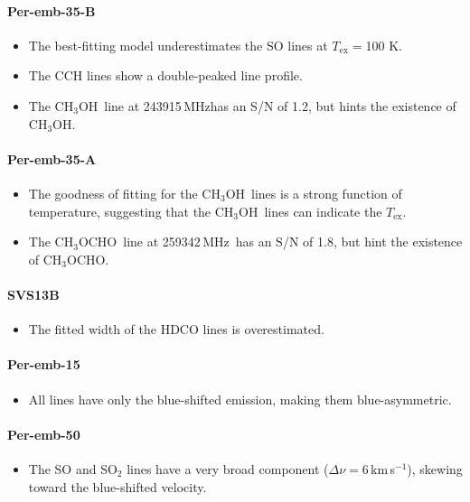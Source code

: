 \documentclass[twocolumn]{aastex62}
\newcommand{\kms}{\mbox{\,km\,s$^{-1}$}}
\newcommand{\mhz}{\mbox{\,MHz}}
\newcommand{\methylformate}{\mbox{CH$_{3}$OCHO}}
\newcommand{\methanol}{\mbox{CH$_{3}$OH}}
\begin{document}
\paragraph{Per-emb-35-B}
\begin{itemize}
  \item The best-fitting model underestimates the SO lines at $T_\text{ex} = $100 K.
  \item The CCH lines show a double-peaked line profile.
  \item The \methanol\ line at 243915\mhz has an S/N of 1.2, but hints the existence of \methanol.
\end{itemize}

\paragraph{Per-emb-35-A}
\begin{itemize}
  \item The goodness of fitting for the \methanol\ lines is a strong function of temperature, suggesting that the \methanol\ lines can indicate the $T_\text{ex}$.
  \item The \methylformate\ line at 259342\mhz\ has an S/N of 1.8, but hint the existence of \methylformate.
\end{itemize}

\paragraph{SVS13B}
\begin{itemize}
  \item The fitted width of the HDCO lines is overestimated.
\end{itemize}

\paragraph{Per-emb-15}
\begin{itemize}
  \item All lines have only the blue-shifted emission, making them blue-asymmetric.
\end{itemize}

\paragraph{Per-emb-50}
\begin{itemize}
  \item The SO and SO$_{2}$ lines have a very broad component ($\Delta \nu = $6\kms), skewing toward the blue-shifted velocity.
\end{itemize}
\end{document}

